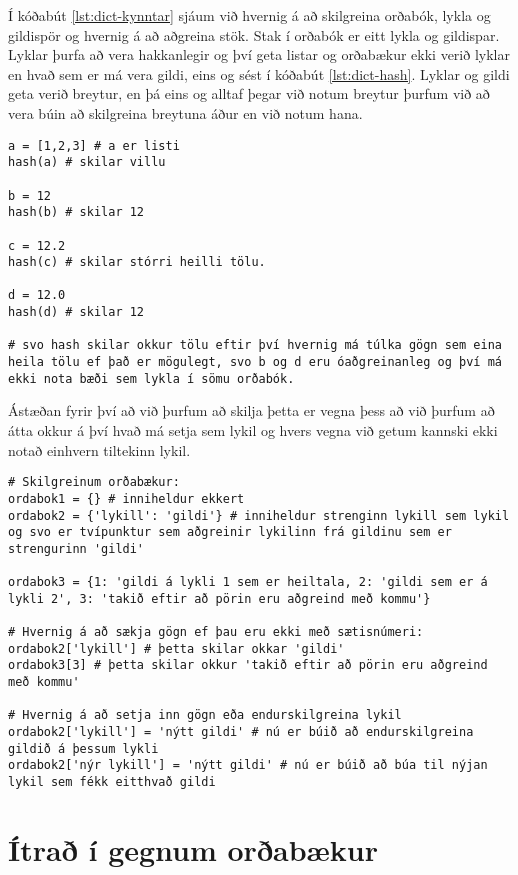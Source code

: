 Í kóðabút \ref{lst:dict-kynntar} sjáum við hvernig á að skilgreina orðabók, lykla og gildispör og hvernig á að aðgreina stök.
Stak í orðabók er eitt lykla og gildispar.
Lyklar þurfa að vera hakkanlegir og því geta listar og orðabækur ekki verið lyklar en hvað sem er má vera gildi, eins og sést í kóðabút \ref{lst:dict-hash}.
Lyklar og gildi geta verið breytur, en þá eins og alltaf þegar við notum breytur þurfum við að vera búin að skilgreina breytuna áður en við notum hana.

\begin{lstlisting}[caption=Skoðum hash() fallið til að skilja aðgreinanleika gagna, label=lst:dict-hash]
a = [1,2,3] # a er listi
hash(a) # skilar villu 

b = 12 
hash(b) # skilar 12

c = 12.2
hash(c) # skilar stórri heilli tölu.

d = 12.0
hash(d) # skilar 12 

# svo hash skilar okkur tölu eftir því hvernig má túlka gögn sem eina heila tölu ef það er mögulegt, svo b og d eru óaðgreinanleg og því má ekki nota bæði sem lykla í sömu orðabók.
\end{lstlisting}

Ástæðan fyrir því að við þurfum að skilja þetta er vegna þess að við þurfum að átta okkur á því hvað má setja sem lykil og hvers vegna við getum kannski ekki notað einhvern tiltekinn lykil.

\begin{lstlisting}[caption=Orðabækur kynntar, label=lst:dict-kynntar]
# Skilgreinum orðabækur:
ordabok1 = {} # inniheldur ekkert
ordabok2 = {'lykill': 'gildi'} # inniheldur strenginn lykill sem lykil og svo er tvípunktur sem aðgreinir lykilinn frá gildinu sem er strengurinn 'gildi'

ordabok3 = {1: 'gildi á lykli 1 sem er heiltala, 2: 'gildi sem er á lykli 2', 3: 'takið eftir að pörin eru aðgreind með kommu'}

# Hvernig á að sækja gögn ef þau eru ekki með sætisnúmeri:
ordabok2['lykill'] # þetta skilar okkar 'gildi' 
ordabok3[3] # þetta skilar okkur 'takið eftir að pörin eru aðgreind með kommu'

# Hvernig á að setja inn gögn eða endurskilgreina lykil
ordabok2['lykill'] = 'nýtt gildi' # nú er búið að endurskilgreina gildið á þessum lykli
ordabok2['nýr lykill'] = 'nýtt gildi' # nú er búið að búa til nýjan lykil sem fékk eitthvað gildi
\end{lstlisting}

\section{Ítrað í gegnum orðabækur}

